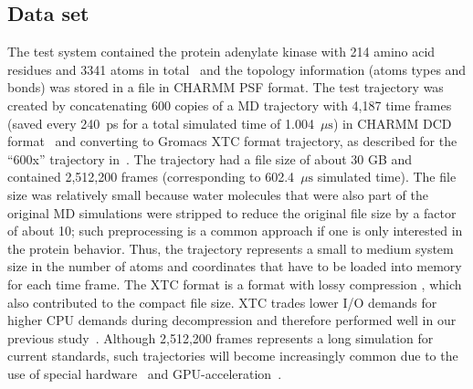 \subsection{Data set}
\label{sec:data}

The test system contained the protein adenylate kinase with 214 amino acid residues and 3341 atoms in total~\cite{Seyler:2014il} and the topology information (atoms types and bonds) was stored in a file in CHARMM PSF format.
The test trajectory was created by concatenating 600 copies of a MD trajectory with 4,187 time frames (saved every 240~ps for a total simulated time of 1.004~$\mu\text{s}$) in CHARMM DCD format~\cite{Seyler:2017aa} and converting to Gromacs XTC format trajectory, as described for the ``600x'' trajectory in~\citet{Khoshlessan:2017ab}.
The trajectory had a file size of about 30 GB and contained 2,512,200 frames (corresponding to 602.4~$\mu\text{s}$ simulated time).
The file size was relatively small because water molecules that were also part of the original MD simulations were stripped to reduce the original file size by a factor of about 10; such preprocessing is a common approach if one is only interested in the protein behavior.
Thus, the trajectory represents a small to medium system size in the number of atoms and coordinates that have to be loaded into memory for each time frame.
The XTC format is a format with lossy compression \citep{Lindahl01, Spangberg:2011zr}, which also contributed to the compact file size.
XTC trades lower I/O demands for higher CPU demands during decompression and therefore performed well in our previous study~\citep{Khoshlessan:2017ab}.
Although 2,512,200 frames represents a long simulation for current standards, such trajectories will become increasingly common due to the use of special hardware~\citep{Shaw:2009ly, Shaw:2014aa} and GPU-acceleration~\citep{Salomon-Ferrer:2013cr, Glaser:2015ys, Abraham:2015aa}.
